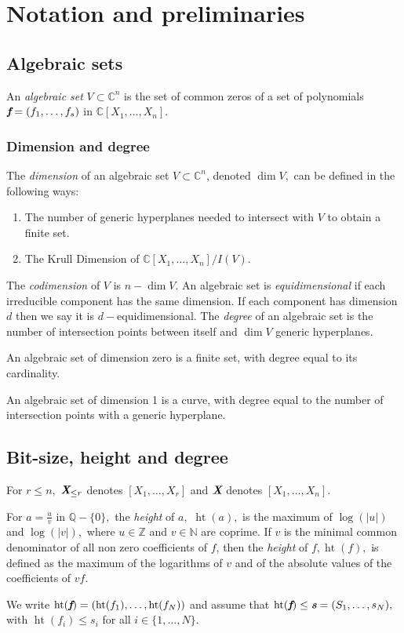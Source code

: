 \documentclass[sigconf]{acmart}
\DeclareMathOperator{\htt}{ht}
\def\C{\mathbb{C}}
\begin{document}
\section{Notation and preliminaries}
%
\subsection{Algebraic sets}
%
An \textit{algebraic set} $V \subset \C^n$ is the set of common zeros of a set of polynomials $\textit{\textbf{f}}=(f_1,\hdots,f_s)$ in $\C[X_1,\hdots,X_n].$
\subsubsection{Dimension and degree}
The \textit{dimension} of an algebraic set $V \subset \C^n$, denoted $\dim V,$ can be defined in the following ways:
%
\begin{enumerate}
    \item The number of generic hyperplanes needed to intersect with $V$ to obtain a finite set. 
    \item The Krull Dimension of $\C[X_1,\hdots,X_n]/I(V)$.
\end{enumerate}
%
The \textit{codimension} of $V$ is $n - \dim V$. An algebraic set is \textit{equidimensional} if each irreducible component has the same dimension.  If each component has dimension $d$ then we say it is $d-$equidimensional. 
The \textit{degree} of an algebraic set is the number of intersection points between itself and $\dim V$ generic hyperplanes.
%
\begin{example} 
An algebraic set of dimension zero is a finite set, with degree equal to its cardinality.
\end{example}
%
\begin{example}
An algebraic set of dimension 1 is a curve, with degree equal to the number of intersection points with a generic hyperplane.
\end{example}
%
\subsection{Bit-size, height and degree}
%
For $r \leq n,$ $\textit{\textbf{X}}_{\leq r}$ denotes $[X_1,\hdots,X_r]$ and $\textit{\textbf{X}}$ denotes $[X_1,\hdots,X_n]$. 
\par 
For $a=\frac{u}{v}$ in $\mathbb{Q}-\{0\},$ the  \textit{height} of $a,$ $\htt(a),$ is the maximum of $\log(|u|)$ and $\log(|v|),$ where $u \in \mathbb{Z}$ and $v \in \mathbb{N}$ are coprime. If $v$ is the minimal common denominator of all non zero coefficients of $f$, then the \textit{height} of $f, \htt(f),$ is defined as the maximum of the logarithms of $v$ and of the absolute values of the coefficients of $vf$. 
%
\par
We write $\htt(\textit{\textbf{f}})=(\htt(f_1),\hdots,\htt(f_N))$ and assume that $\htt(\textit{\textbf{f}}) \leq \textit{\textbf{s}} = (S_1,\hdots,s_N),$  with $\htt(f_i) \leq s_i$ for all $i \in \{ 1,\hdots,N\}.$
%
\end{document}
